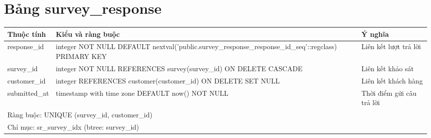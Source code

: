 \section{Bảng survey\_response}
\begin{longtable}{|p{}|p{}|p{}|}\hline
\textbf{Thuộc tính}&\textbf{Kiểu và ràng buộc}&\textbf{Ý nghĩa}\\\hline\endhead
response\_id & integer NOT NULL DEFAULT nextval('public.survey\_response\_response\_id\_seq'::regclass) PRIMARY KEY & Liên kết lượt trả lời\\\hline
survey\_id & integer NOT NULL REFERENCES survey(survey\_id) ON DELETE CASCADE & Liên kết khảo sát\\\hline
customer\_id & integer REFERENCES customer(customer\_id) ON DELETE SET NULL & Liên kết khách hàng\\\hline
submitted\_at & timestamp with time zone DEFAULT now() NOT NULL & Thời điểm gửi câu trả lời\\\hline
\multicolumn{3}{|p{0.93\textwidth}|}{Ràng buộc: UNIQUE (survey\_id, customer\_id)}\\\hline
\multicolumn{3}{|p{0.93\textwidth}|}{Chỉ mục: sr\_survey\_idx (btree: survey\_id)}\\\hline
\end{longtable}
\normalsize
